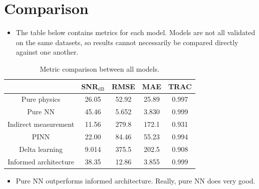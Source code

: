 \documentclass[letterpaper]{article}\usepackage{mathtools,amssymb,latexsym,graphics,enumerate}
\numberwithin{equation}{section}
\numberwithin{remark}{section}
\numberwithin{lem}{section}
\newcommand{\tl}[1]{\textcolor[rgb]{0,0.6,0.60}{#1}}
\begin{document}
	\section{Comparison}
	\begin{itemize}
		\item The table below contains metrics for each model. Models are not all validated on the same datasets, so results cannot necessarily be compared directly against one another.
	\end{itemize}
	\begin{table}[H]
		\label{all metrics}
		\caption{Metric comparison between all models.}
		\begin{center}
			\begin{tabular}{c c c c c}
				& SNR$_\text{dB}$ & RMSE & MAE & TRAC \\ \hline
				Pure physics & 26.05 & 52.92 & 25.89 & 0.997 \\
				Pure NN & 45.46 & 5.652 & 3.830 & 0.999 \\
				Indirect measurement & 11.56 & 279.8 & 172.1 & 0.931 \\
				PINN & 22.00 & 84.46 & 55.23 & 0.994 \\
				Delta learning & 9.014 & 375.5 & 202.5 & 0.908 \\
				Informed architecture & 38.35 & 12.86 & 3.855 & 0.999 \\
			\end{tabular}
		\end{center}
	\end{table}
		\begin{itemize}
		\item \tl{Pure NN outperforms informed architecture. Really, pure NN does very good.}
	\end{itemize}
	
\end{document}
